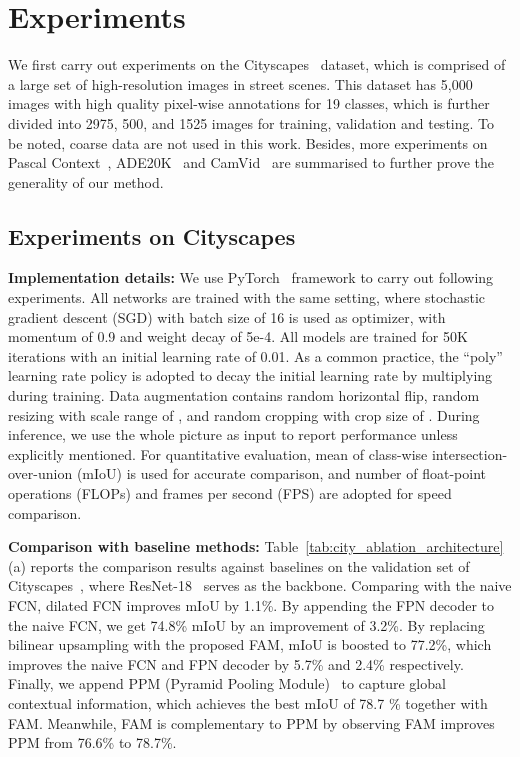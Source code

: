 
\section{Experiments}
We first carry out experiments on the Cityscapes~\cite{Cityscapes} dataset, which is comprised of a large set of high-resolution  images in street scenes. This dataset has 5,000 images with high quality pixel-wise annotations for 19 classes, which is further divided into 2975, 500, and 1525 images for training, validation and testing. To be noted, coarse data are not used in this work. Besides, more experiments on Pascal Context~\cite{VOC}, ADE20K~\cite{ADE20K} and CamVid~\cite{CamVid} are summarised to further prove the generality of our method. 

\subsection{Experiments on Cityscapes}

\noindent
\textbf{Implementation details:} We use PyTorch~\cite{pytorch} framework to carry out following experiments. All networks are trained with the same setting, where stochastic gradient descent (SGD) with batch size of 16 is used as optimizer, with momentum of 0.9 and weight decay of 5e-4. All models are trained for 50K iterations with an initial learning rate of 0.01. As a common practice, the ``poly'' learning rate policy is adopted to decay the initial learning rate by multiplying  during training. Data augmentation contains random horizontal flip, random resizing with scale range of , and random cropping with crop size of . During inference, we use the whole picture as input to report performance unless explicitly mentioned. For quantitative evaluation, mean of class-wise intersection-over-union (mIoU) is used for accurate comparison, and number of float-point operations (FLOPs) and frames per second (FPS) are adopted for speed comparison.

\noindent
\textbf{Comparison with baseline methods: } Table~\ref{tab:city_ablation_architecture}(a) reports the  comparison results against baselines on the validation set of Cityscapes~\cite{Cityscapes}, where ResNet-18~\cite{resnet} serves as the backbone. Comparing with the naive FCN, dilated FCN improves mIoU by 1.1\%.  By appending the FPN decoder to the naive FCN, we get 74.8\% mIoU by an improvement of 3.2\%. By replacing bilinear upsampling with the proposed FAM, mIoU is boosted to 77.2\%, which improves the naive FCN and FPN decoder by 5.7\% and 2.4\% respectively. Finally, we append PPM (Pyramid Pooling Module)~\cite{pspnet} to capture global contextual information, which achieves the best mIoU of 78.7 \% together with FAM. Meanwhile, FAM is complementary to PPM by observing FAM improves PPM from 76.6\% to 78.7\%.


